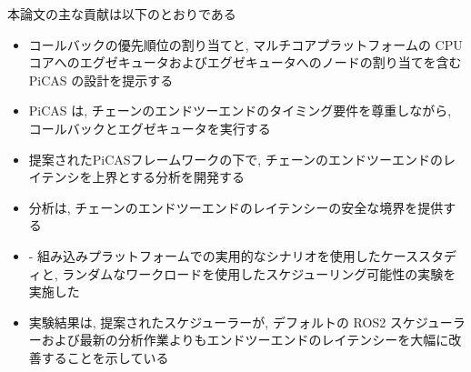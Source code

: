 \begin{frame}{}
    本論文の主な貢献は以下のとおりである
    \begin{itemize}
        \item  コールバックの優先順位の割り当てと, マルチコアプラットフォームの CPU コアへのエグゼキュータおよびエグゼキュータへのノードの割り当てを含む PiCAS の設計を提示する
\item PiCAS は, チェーンのエンドツーエンドのタイミング要件を尊重しながら, コールバックとエグゼキュータを実行する

        \item  提案されたPiCASフレームワークの下で, チェーンのエンドツーエンドのレイテンシを上界とする分析を開発する
\item 分析は, チェーンのエンドツーエンドのレイテンシーの安全な境界を提供する
\item - 組み込みプラットフォームでの実用的なシナリオを使用したケーススタディと, ランダムなワークロードを使用したスケジューリング可能性の実験を実施した
\item 実験結果は, 提案されたスケジューラーが, デフォルトの ROS2 スケジューラーおよび最新の分析作業よりもエンドツーエンドのレイテンシーを大幅に改善することを示している
    \end{itemize}
\end{frame}
